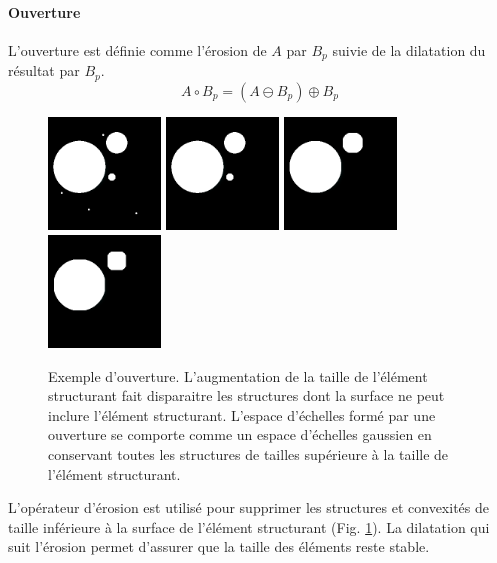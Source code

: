 \paragraph{Ouverture}
L'ouverture est définie comme l'érosion de $A$ par $B_p$ suivie de la dilatation du résultat par $B_p$.
\begin{equation}
 A \circ B_p = (A \ominus B_p) \oplus B_p
\end{equation}
\begin{figure}[h]
  \centering
  \includegraphics[height=3cm]{Images/morpho_init.png}
  \includegraphics[height=3cm]{Images/morpho_open_k5.png}
  \includegraphics[height=3cm]{Images/morpho_open_k21.png}
  \includegraphics[height=3cm]{Images/morpho_open_k31.png}
  \caption{Exemple d'ouverture. L'augmentation de la taille de l'élément structurant fait disparaitre les structures dont la surface ne peut inclure l'élément structurant. L'espace d'échelles formé par une ouverture se comporte comme un espace d'échelles gaussien en conservant toutes les structures de tailles supérieure à la taille de l'élément structurant. }
  \label{fig:morpho_ouverture}
\end{figure}
L'opérateur d'érosion est utilisé pour supprimer les structures et convexités de taille inférieure à la surface de l'élément structurant (Fig. \ref{fig:morpho_ouverture}). La dilatation qui suit l'érosion permet d'assurer que la taille des éléments reste stable.

